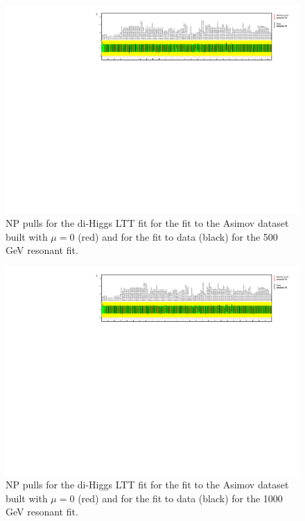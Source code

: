 \begin{figure}
\centering
\includegraphics[angle=270]{figures/results/HH/LepHad/NP_allExceptGammas_2HDM500_LTT.pdf}
\caption{NP pulls for the di-Higgs \lephad LTT fit for the fit to the Asimov dataset built with $\mu=0$ (red) and for the fit to data (black) for the 500 GeV resonant fit.}
\label{fig:LepHadPostfitNPPulls2HDM500LTT}
\end{figure}

\begin{figure}
\centering
\includegraphics[angle=270]{figures/results/HH/LepHad/NP_allExceptGammas_2HDM1000_LTT.pdf}
\caption{NP pulls for the di-Higgs \lephad LTT fit for the fit to the Asimov dataset built with $\mu=0$ (red) and for the fit to data (black) for the 1000 GeV resonant fit.}
\label{fig:LepHadPostfitNPPulls2HDM1000LTT}
\end{figure}

